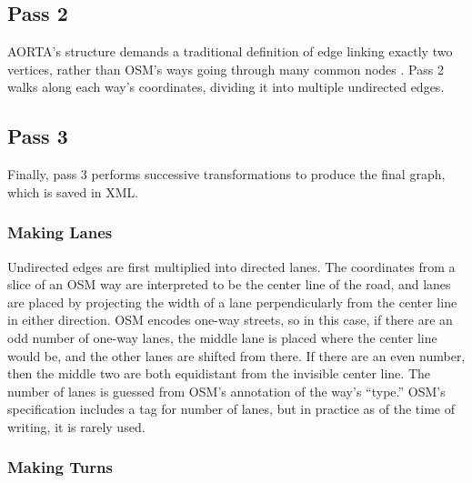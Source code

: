 \documentclass[letterpaper, 10 pt, conference]{ieeeconf}  %
\begin{document}
\subsection{Pass 2}

AORTA's structure demands a traditional definition of edge linking exactly two
vertices, rather than OSM's ways going through many common nodes . Pass 2 walks
along each way's coordinates, dividing it into multiple undirected edges.

\subsection{Pass 3}

Finally, pass 3 performs successive transformations to produce the final graph,
which is saved in XML.

\subsubsection{Making Lanes}



Undirected edges are first multiplied into directed lanes. The coordinates from
a slice of an OSM way are interpreted to be the center line of the road, and
lanes are placed by projecting the width of a lane perpendicularly from the
center line in either direction. OSM encodes one-way streets, so in this case,
if there are an odd number of one-way lanes, the middle lane is placed where the
center line would be, and the other lanes are shifted from there. If there are
an even number, then the middle two are both equidistant from the invisible
center line. The number of lanes is guessed from OSM's annotation of the way's
``type.'' OSM's specification includes a tag for number of lanes, but in
practice as of the time of writing, it is rarely used.

\subsubsection{Making Turns}
\end{document}
